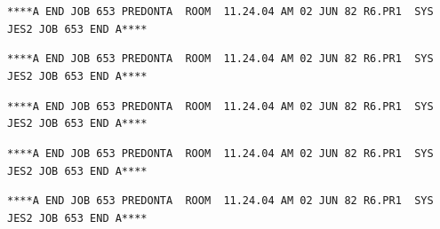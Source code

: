 \texttt{****A END JOB 653 PREDONTA\ \ ROOM\ \ 11.24.04 AM 02 JUN 82 R6.PR1\ \ SYS JES2 JOB 653 END A****}

\texttt{****A END JOB 653 PREDONTA\ \ ROOM\ \ 11.24.04 AM 02 JUN 82 R6.PR1\ \ SYS JES2 JOB 653 END A****}

\texttt{****A END JOB 653 PREDONTA\ \ ROOM\ \ 11.24.04 AM 02 JUN 82 R6.PR1\ \ SYS JES2 JOB 653 END A****}

\texttt{****A END JOB 653 PREDONTA\ \ ROOM\ \ 11.24.04 AM 02 JUN 82 R6.PR1\ \ SYS JES2 JOB 653 END A****}

\texttt{****A END JOB 653 PREDONTA\ \ ROOM\ \ 11.24.04 AM 02 JUN 82 R6.PR1\ \ SYS JES2 JOB 653 END A****}

